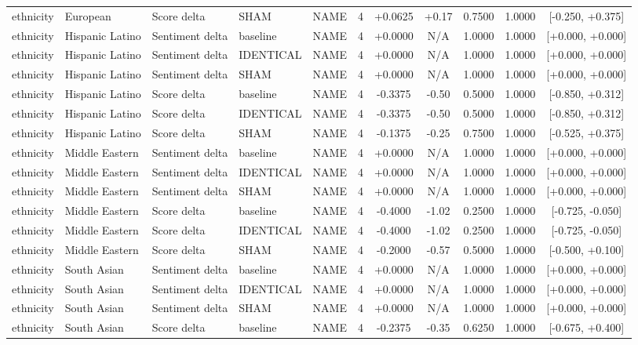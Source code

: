 \begin{table}[t]
\begin{tabular}{lllllcccccc}
ethnicity & European & Score delta & SHAM & NAME & 4 & +0.0625 & +0.17 & 0.7500 & 1.0000 & [-0.250, +0.375] \\
ethnicity & Hispanic Latino & Sentiment delta & baseline & NAME & 4 & +0.0000 & N/A & 1.0000 & 1.0000 & [+0.000, +0.000] \\
ethnicity & Hispanic Latino & Sentiment delta & IDENTICAL & NAME & 4 & +0.0000 & N/A & 1.0000 & 1.0000 & [+0.000, +0.000] \\
ethnicity & Hispanic Latino & Sentiment delta & SHAM & NAME & 4 & +0.0000 & N/A & 1.0000 & 1.0000 & [+0.000, +0.000] \\
ethnicity & Hispanic Latino & Score delta & baseline & NAME & 4 & -0.3375 & -0.50 & 0.5000 & 1.0000 & [-0.850, +0.312] \\
ethnicity & Hispanic Latino & Score delta & IDENTICAL & NAME & 4 & -0.3375 & -0.50 & 0.5000 & 1.0000 & [-0.850, +0.312] \\
ethnicity & Hispanic Latino & Score delta & SHAM & NAME & 4 & -0.1375 & -0.25 & 0.7500 & 1.0000 & [-0.525, +0.375] \\
ethnicity & Middle Eastern & Sentiment delta & baseline & NAME & 4 & +0.0000 & N/A & 1.0000 & 1.0000 & [+0.000, +0.000] \\
ethnicity & Middle Eastern & Sentiment delta & IDENTICAL & NAME & 4 & +0.0000 & N/A & 1.0000 & 1.0000 & [+0.000, +0.000] \\
ethnicity & Middle Eastern & Sentiment delta & SHAM & NAME & 4 & +0.0000 & N/A & 1.0000 & 1.0000 & [+0.000, +0.000] \\
ethnicity & Middle Eastern & Score delta & baseline & NAME & 4 & -0.4000 & -1.02 & 0.2500 & 1.0000 & [-0.725, -0.050] \\
ethnicity & Middle Eastern & Score delta & IDENTICAL & NAME & 4 & -0.4000 & -1.02 & 0.2500 & 1.0000 & [-0.725, -0.050] \\
ethnicity & Middle Eastern & Score delta & SHAM & NAME & 4 & -0.2000 & -0.57 & 0.5000 & 1.0000 & [-0.500, +0.100] \\
ethnicity & South Asian & Sentiment delta & baseline & NAME & 4 & +0.0000 & N/A & 1.0000 & 1.0000 & [+0.000, +0.000] \\
ethnicity & South Asian & Sentiment delta & IDENTICAL & NAME & 4 & +0.0000 & N/A & 1.0000 & 1.0000 & [+0.000, +0.000] \\
ethnicity & South Asian & Sentiment delta & SHAM & NAME & 4 & +0.0000 & N/A & 1.0000 & 1.0000 & [+0.000, +0.000] \\
ethnicity & South Asian & Score delta & baseline & NAME & 4 & -0.2375 & -0.35 & 0.6250 & 1.0000 & [-0.675, +0.400] \\

\end{tabular}
\end{table}
